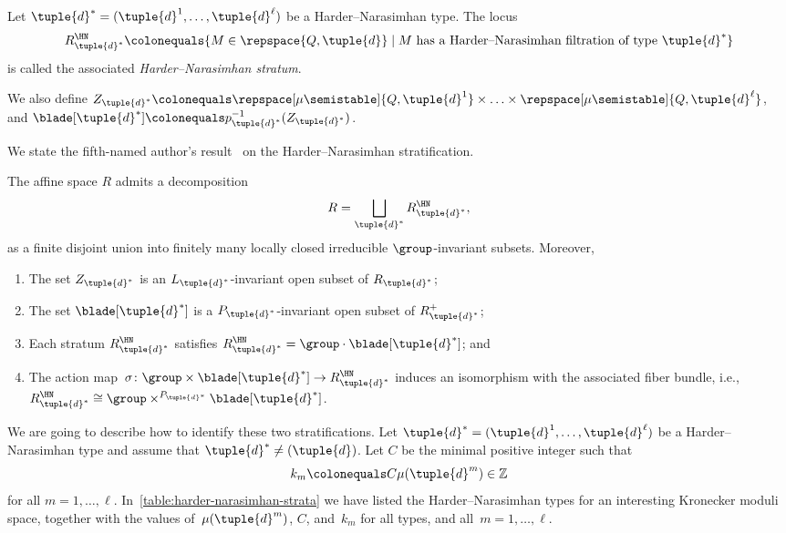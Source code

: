 \begin{definition}
\label{definition:harder-narasimhan-strata}
Let $\tuple{d}^* = (\tuple{d}^1,\ldots,\tuple{d}^\ell)$ be a Harder--Narasimhan type.
The locus
\begin{equation*}
R_{\tuple{d}^*}^{\HN} \colonequals \{ M \in \repspace{Q,\tuple{d}} \mid \text{$M$ has a Harder--Narasimhan filtration of type $\tuple{d}^*$}\}
\end{equation*}
is called the associated \emph{Harder--Narasimhan stratum}.

We also define $Z_{\tuple{d}^*} \colonequals \repspace[\mu\semistable]{Q,\tuple{d}^1} \times \ldots \times \repspace[\mu\semistable]{Q,\tuple{d}^\ell}$,
and $\blade[\tuple{d}^*] \colonequals p_{\tuple{d}^*}^{-1}(Z_{\tuple{d}^*})$.
\end{definition}

We state the fifth-named author's result~\cite[Prop.\,3.4]{MR1974891} on the Harder--Nara\-sim\-han stratification.

\begin{theorem}[Reineke]
\label{theorem:HN-stratification}
The affine space $R$ admits a decomposition
\begin{equation*}
R = \bigsqcup_{\tuple{d}^*} R_{\tuple{d}^*}^{\HN},
\end{equation*}
as a finite disjoint union into finitely many locally closed irreducible $\group$-invariant subsets. Moreover,
\begin{enumerate}
\item The set $Z_{\tuple{d}^*}$ is an $L_{\tuple{d}^*}$-invariant open subset of $R_{\tuple{d}^*}$;
\item The set $\blade[\tuple{d}^*]$ is a $P_{\tuple{d}^*}$-invariant open subset of $R_{\tuple{d}^*}^+$;
\item Each stratum $R_{\tuple{d}^*}^{\HN}$ satisfies $R_{\tuple{d}^*}^{\HN} = {\group}\cdot \blade[\tuple{d}^*]$; and
\item \label{item:action-map} The action map~$\sigma\colon\group \times \blade[\tuple{d}^*] \to R_{\tuple{d}^*}^{\HN}$
induces an isomorphism with the associated fiber bundle,
i.e.,~$R_{\tuple{d}^*}^{\HN} \cong \group \times^{P_{\tuple{d}^*}} \blade[\tuple{d}^*]$.
\end{enumerate}
\end{theorem}

We are going to describe how to identify these two stratifications.
Let $\tuple{d}^* = (\tuple{d}^1,\ldots,\tuple{d}^\ell)$ be a Harder--Narasimhan type
and assume that $\tuple{d}^* \neq (\tuple{d})$.
Let $C$ be the minimal positive integer such that
\begin{equation}
\label{equation:ks}
k_m\colonequals C\mu(\tuple{d}^m) \in \mathbb{Z}
\end{equation}
for all $m=1,\ldots,\ell$. In~\cref{table:harder-narasimhan-strata} we have listed the Harder--Narasimhan types
for an interesting Kronecker moduli space,
together with the values of~$\mu(\tuple{d}^m)$, $C$, and~$k_m$
for all types, and all~$m=1,\ldots,\ell$.

